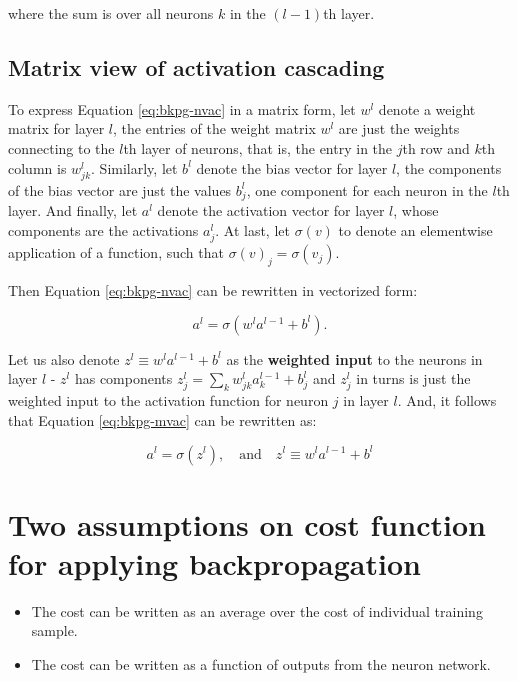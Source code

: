 \documentclass[]{book}
\begin{document}
where the sum is over all neurons \(k\) in the \((l-1)\)th layer.

\subsection{Matrix view of activation
cascading}\label{matrix-view-of-activation-cascading}

To express Equation \eqref{eq:bkpg-nvac} in a matrix form, let \(w^l\)
denote a weight matrix for layer \(l\), the entries of the weight matrix
\(w^l\) are just the weights connecting to the \(l\)th layer of neurons,
that is, the entry in the \(j\)th row and \(k\)th column is
\(w^l_{jk}\). Similarly, let \(b^l\) denote the bias vector for layer
\(l\), the components of the bias vector are just the values \(b^l_j\),
one component for each neuron in the \(l\)th layer. And finally, let
\(a^l\) denote the activation vector for layer \(l\), whose components
are the activations \(a^l_j\). At last, let \(\sigma(v)\) to denote an
elementwise application of a function, such that
\(\sigma(v)_j = \sigma(v_j)\).

Then Equation \eqref{eq:bkpg-nvac} can be rewritten in vectorized form:

\begin{equation} 
a^{l} = \sigma(w^l a^{l-1}+b^l). \label{eq:bkpg-mvac}
\end{equation}

Let us also denote \textbf{\(z^l \equiv w^l a^{l-1}+b^l\)} as the
\textbf{weighted input} to the neurons in layer \(l\) - \(z^l\) has
components \(z^l_j= \sum_k w^l_{jk} a^{l-1}_k+b^l_j\) and \(z^l_j\) in
turns is just the weighted input to the activation function for neuron
\(j\) in layer \(l\). And, it follows that Equation \eqref{eq:bkpg-mvac}
can be rewritten as:

\begin{equation} 
a^{l} = \sigma(z^l), \quad\mbox{and}\quad z^l \equiv w^l a^{l-1}+b^l \label{eq:bkpg-mvaz}
\end{equation}

\section{Two assumptions on cost function for applying
backpropagation}\label{two-assumptions-on-cost-function-for-applying-backpropagation}

\begin{itemize}
\item
  The cost can be written as an average over the cost of individual
  training sample.
\item
  The cost can be written as a function of outputs from the neuron
  network.
\end{itemize}
\end{document}
